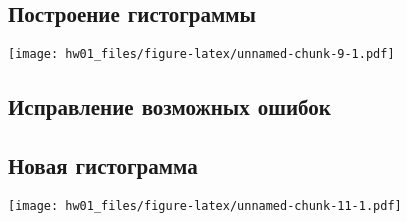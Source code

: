 \documentclass[
]{article}
\newenvironment{Shaded}{\begin{snugshade}}{\end{snugshade}}
\newcommand{\AttributeTok}[1]{\textcolor[rgb]{0.13,0.29,0.53}{#1}}
\newcommand{\ConstantTok}[1]{\textcolor[rgb]{0.56,0.35,0.01}{#1}}
\newcommand{\DecValTok}[1]{\textcolor[rgb]{0.00,0.00,0.81}{#1}}
\newcommand{\FunctionTok}[1]{\textcolor[rgb]{0.13,0.29,0.53}{\textbf{#1}}}
\newcommand{\NormalTok}[1]{#1}
\newcommand{\OtherTok}[1]{\textcolor[rgb]{0.56,0.35,0.01}{#1}}
\newcommand{\SpecialCharTok}[1]{\textcolor[rgb]{0.81,0.36,0.00}{\textbf{#1}}}
\newcommand{\StringTok}[1]{\textcolor[rgb]{0.31,0.60,0.02}{#1}}
\begin{document}
\begin{Shaded}
\end{Shaded}

\subsection{Построение
гистограммы}\label{ux43fux43eux441ux442ux440ux43eux435ux43dux438ux435-ux433ux438ux441ux442ux43eux433ux440ux430ux43cux43cux44b}

\begin{Shaded}
\end{Shaded}

\texttt{[image: hw01\_files/figure-latex/unnamed-chunk-9-1.pdf]}

\subsection{Исправление возможных
ошибок}\label{ux438ux441ux43fux440ux430ux432ux43bux435ux43dux438ux435-ux432ux43eux437ux43cux43eux436ux43dux44bux445-ux43eux448ux438ux431ux43eux43a}

\begin{Shaded}
\end{Shaded}

\subsection{Новая
гистограмма}\label{ux43dux43eux432ux430ux44f-ux433ux438ux441ux442ux43eux433ux440ux430ux43cux43cux430}

\begin{Shaded}
\end{Shaded}

\texttt{[image: hw01\_files/figure-latex/unnamed-chunk-11-1.pdf]}
\end{document}
